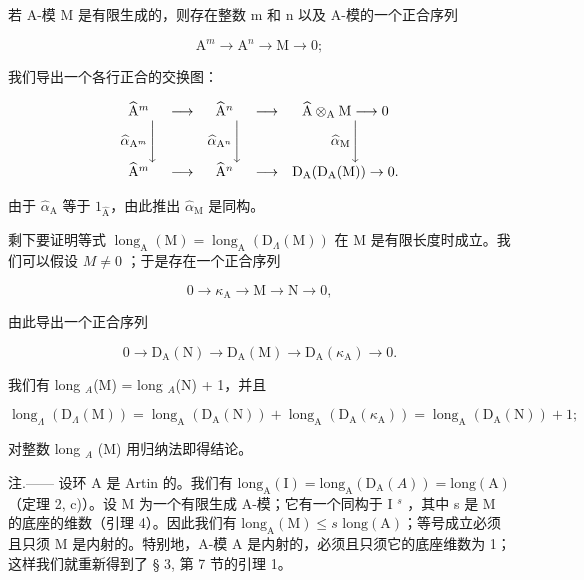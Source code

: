 若 A-模 M 是有限生成的，则存在整数 m 和 n 以及 A-模的一个正合序列

\[
\mathrm{A} ^ {m} \longrightarrow \mathrm{A} ^ {n} \longrightarrow \mathrm{M} \rightarrow 0;
\]

我们导出一个各行正合的交换图：

\[
\begin{array}{c c c c c} \widehat {\mathrm{A}} ^ {m} & \longrightarrow & \widehat {\mathrm{A}} ^ {n} & \longrightarrow & \widehat {\mathrm{A}} \otimes_ {\mathrm{A}} \mathrm{M} \longrightarrow 0 \\ \widehat {\alpha} _ {\mathrm{A} ^ {m}} \Bigg \downarrow & & \widehat {\alpha} _ {\mathrm{A} ^ {n}} \Bigg \downarrow & & \widehat {\alpha} _ {\mathrm{M}} \Bigg \downarrow \\ \widehat {\mathrm{A}} ^ {m} & \longrightarrow & \widehat {\mathrm{A}} ^ {n} & \longrightarrow & \mathrm{D} _ {\mathrm{A}} (\mathrm{D} _ {\mathrm{A}} (\mathrm{M})) \to 0. \end{array}
\]

由于 \(\widehat{\alpha}_{\mathrm{A}}\) 等于 \(1_{\widehat{\mathrm{A}}}\)，由此推出 \(\widehat{\alpha}_{\mathrm{M}}\) 是同构。

剩下要证明等式 \(\operatorname{long}_{\mathrm{A}}(\mathrm{M}) = \operatorname{long}_{\mathrm{A}}(\mathrm{D}_{\Lambda}(\mathrm{M}))\) 在 M 是有限长度时成立。我们可以假设 \(M \neq 0\) ；于是存在一个正合序列

\[
0 \rightarrow \kappa_ {\mathrm{A}} \longrightarrow \mathrm{M} \longrightarrow \mathrm{N} \rightarrow 0,
\]

由此导出一个正合序列

\[
0 \rightarrow \mathrm{D} _ {\mathrm{A}} (\mathrm{N}) \longrightarrow \mathrm{D} _ {\mathrm{A}} (\mathrm{M}) \longrightarrow \mathrm{D} _ {\mathrm{A}} (\kappa_ {\mathrm{A}}) \rightarrow 0.
\]

我们有 long \(_{A}\)(M) = long \(_{A}\)(N) + 1，并且

\[
\operatorname{long} _ {\Lambda} \left(\mathrm{D} _ {\Lambda} (\mathrm{M})\right) = \operatorname{long} _ {\mathrm{A}} \left(\mathrm{D} _ {\mathrm{A}} (\mathrm{N})\right) + \operatorname{long} _ {\mathrm{A}} \left(\mathrm{D} _ {\mathrm{A}} \left(\kappa_ {\mathrm{A}}\right)\right) = \operatorname{long} _ {\mathrm{A}} \left(\mathrm{D} _ {\mathrm{A}} (\mathrm{N})\right) + 1;
\]

对整数 long \(_{A}\) (M) 用归纳法即得结论。

注.—— 设环 A 是 Artin 的。我们有 \(\text{long}_{\text{A}}(\text{I}) = \text{long}_{\text{A}}(\text{D}_{\text{A}}(A)) = \text{long}(\text{A})\)（定理 2, c)）。设 M 为一个有限生成 A-模；它有一个同构于 I \(^{s}\) ，其中 s 是 M 的底座的维数（引理 4）。因此我们有 \(\text{long}_{\text{A}}(\text{M}) \leqslant s \text{ long}(\text{A})\)；等号成立必须且只须 M 是内射的。特别地，A-模 A 是内射的，必须且只须它的底座维数为 1；这样我们就重新得到了 § 3, 第 7 节的引理 1。

